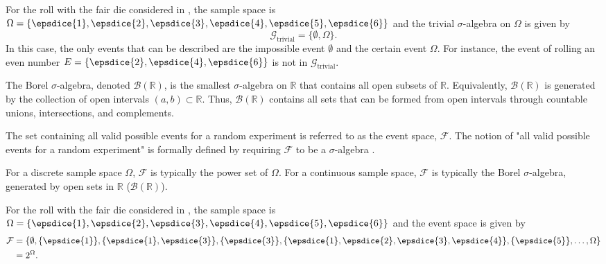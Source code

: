 \begin{example}
	\label{ex:die1a}
	For the roll with the fair die considered in , the sample space is $\Omega = \{ \epsdice{1}, \epsdice{2}, \epsdice{3}, \epsdice{4}, \epsdice{5}, \epsdice{6} \}$ and the trivial $\sigma$-algebra on $\Omega$ is given by
	\begin{equation}
		\mathcal{G}_{\text{trivial}} = \{\emptyset, \Omega\}.
	\end{equation}
	In this case, the only events that can be described are the impossible event $\emptyset$ and the certain event $\Omega$. For instance, the event of rolling an even number $E = \{\epsdice{2}, \epsdice{4}, \epsdice{6}\}$ is not in $\mathcal{G}_{\text{trivial}}$.
\end{example}

\begin{definition}
	\label{def:borel_sigma_algebra}
	The Borel $\sigma$-algebra, denoted $\mathcal{B}(\mathbb{R})$, is the smallest $\sigma$-algebra on $\mathbb{R}$ that contains all open subsets of $\mathbb{R}$.  Equivalently, $\mathcal{B}(\mathbb{R})$ is generated by the collection of open intervals $(a,b) \subset \mathbb{R}$. Thus, $\mathcal{B}(\mathbb{R})$ contains all sets that can be formed from open intervals through countable unions, intersections, and complements.  
\end{definition}

\begin{definition}
	\label{def:event_space}
	The set containing all valid possible events for a random experiment is referred to as the event space, $\mathcal{F}$. The notion of "all valid possible events for a random experiment" is formally defined by requiring $\mathcal{F}$ to be a $\sigma$-algebra .
\end{definition}

\begin{remark}
	For a discrete sample space $\Omega$, $\mathcal{F}$ is typically the power set of $\Omega$. For a continuous sample space, $\mathcal{F}$ is typically the Borel $\sigma$-algebra, generated by open sets in $\mathbb{R}$ ($\mathcal{B}(\mathbb{R})$).
\end{remark}

\begin{example}
	\label{ex:die2}
	For the roll with the fair die considered in , the sample space is $\Omega = \{ \epsdice{1}, \epsdice{2}, \epsdice{3}, \epsdice{4}, \epsdice{5}, \epsdice{6} \}$ and the event space is given by
	\begin{equation}
		\begin{split}
			\mathcal{F}&=\{\emptyset, \{\epsdice{1}\},\{\epsdice{1},\epsdice{3}\},\{\epsdice{3}\},\{\epsdice{1},\epsdice{2},\epsdice{3},\epsdice{4}\},\{\epsdice{5}\},\dots,\Omega\}\\
			& = 2^\Omega.
		\end{split}
	\end{equation}
\end{example}

